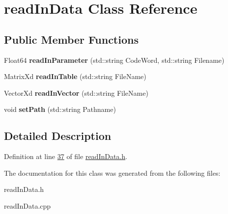 \hypertarget{classread_in_data}{}\section{read\+In\+Data Class Reference}
\label{classread_in_data}
\subsection*{Public Member Functions}
\begin{DoxyCompactItemize}
\item 
\mbox{\label{classread_in_data_a9ae979e74958b43424cb6cf4a22043d7}} 
Float64 {\bfseries read\+In\+Parameter} (std\+::string Code\+Word, std\+::string Filename)
\item 
\mbox{\label{classread_in_data_af616573832efc2c27f07f5f6877b1386}} 
Matrix\+Xd {\bfseries read\+In\+Table} (std\+::string File\+Name)
\item 
\mbox{\label{classread_in_data_ab57aff38529234593d786ecace301cf7}} 
Vector\+Xd {\bfseries read\+In\+Vector} (std\+::string File\+Name)
\item 
\mbox{\label{classread_in_data_ad67d566fd837f6d721db279144d484e0}} 
void {\bfseries set\+Path} (std\+::string Pathname)
\end{DoxyCompactItemize}


\subsection{Detailed Description}


Definition at line \hyperlink{read_in_data_8h_source_l00037}{37} of file \hyperlink{read_in_data_8h_source}{read\+In\+Data.\+h}.



The documentation for this class was generated from the following files\+:\begin{DoxyCompactItemize}
\item 
read\+In\+Data.\+h\item 
read\+In\+Data.\+cpp\end{DoxyCompactItemize}
